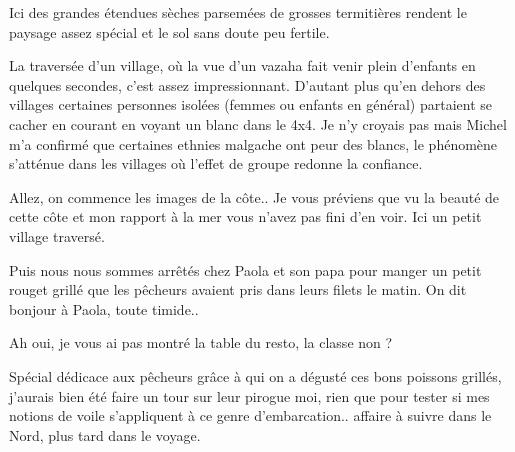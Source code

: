 \begin{multicols}{2}

Ici des grandes étendues sèches parsemées de grosses termitières rendent le paysage assez spécial et le sol sans doute peu fertile.


La traversée d'un village, où la vue d'un vazaha fait venir plein d'enfants en quelques secondes, c'est assez impressionnant. D'autant plus qu'en dehors des villages certaines personnes isolées (femmes ou enfants en général) partaient se cacher en courant en voyant un blanc dans le 4x4. Je n'y croyais pas mais Michel m'a confirmé que certaines ethnies malgache ont peur des blancs, le phénomène s'atténue dans les villages où l'effet de groupe redonne la confiance.


Allez, on commence les images de la côte.. Je vous préviens que vu la beauté de cette côte et mon rapport à la mer vous n'avez pas fini d'en voir. Ici un petit village traversé.


Puis nous nous sommes arrêtés chez Paola et son papa pour manger un petit rouget grillé que les pêcheurs avaient pris dans leurs filets le matin. On dit bonjour à Paola, toute timide..


Ah oui, je vous ai pas montré la table du resto, la classe non ?


Spécial dédicace aux pêcheurs grâce à qui on a dégusté ces bons poissons grillés, j'aurais bien été faire un tour sur leur pirogue moi, rien que pour tester si mes notions de voile s'appliquent à ce genre d'embarcation.. affaire à suivre dans le Nord, plus tard dans le voyage.


\end{multicols}
